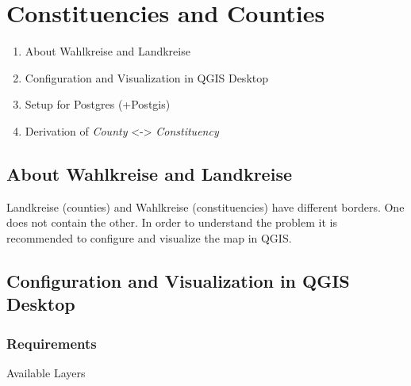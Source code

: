 
\section{Constituencies and Counties}

\begin{enumerate}
\def\labelenumi{\arabic{enumi}.}
\itemsep1pt\parskip0pt
\item
  About Wahlkreise and Landkreise
\item
  Configuration and Visualization in QGIS Desktop
\item
  Setup for Postgres (+Postgis)
\item
  Derivation of \emph{County} \textless{}-\textgreater{}
  \emph{Constituency}
\end{enumerate}

\subsection{About Wahlkreise and
Landkreise}\label{about-wahlkreise-and-landkreise}

Landkreise (counties) and Wahlkreise (constituencies) have different borders.
One does not contain the other. In order to understand the problem it is
recommended to configure and visualize the map in QGIS.

\subsection{Configuration and Visualization in QGIS
Desktop}\label{configuration-and-visualization-in-qgis-desktop}

\subsubsection{Requirements}\label{requirements}

Available Layers

